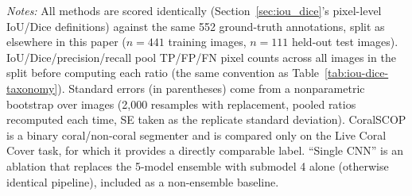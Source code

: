\documentclass[11pt]{elsarticle}
\begin{document}
\begin{table}[htbp]
\centering
\caption{Live coral cover (coral vs.\ non-coral) segmentation quality: Present model vs.\ CoralSCOP.}
\label{tab:coralscop-comparison}
\begin{tablenotes}
\item \emph{Notes:} All methods are scored identically (Section~\ref{sec:iou_dice}'s pixel-level IoU/Dice definitions) against the same 552 ground-truth annotations, split as elsewhere in this paper ($n=441$ training images, $n=111$ held-out test images). IoU/Dice/precision/recall pool TP/FP/FN pixel counts across all images in the split before computing each ratio (the same convention as Table~\ref{tab:iou-dice-taxonomy}). Standard errors (in parentheses) come from a nonparametric bootstrap over images (2,000 resamples with replacement, pooled ratios recomputed each time, SE taken as the replicate standard deviation). CoralSCOP is a binary coral/non-coral segmenter and is compared only on the Live Coral Cover task, for which it provides a directly comparable label. ``Single CNN'' is an ablation that replaces the 5-model ensemble with submodel 4 alone (otherwise identical pipeline), included as a non-ensemble baseline.
\end{tablenotes}
\end{table}
\end{document}
